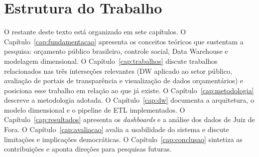 \section{Estrutura do Trabalho}

O restante deste texto está organizado em sete capítulos. O Capítulo~\ref{cap:fundamentacao} apresenta os conceitos teóricos que sustentam a pesquisa: orçamento público brasileiro, controle social, Data Warehouse e modelagem dimensional. O Capítulo~\ref{cap:trabalhos} discute trabalhos relacionados nas três interseções relevantes (DW aplicado ao setor público, avaliação de portais de transparência e visualização de dados orçamentários) e posiciona esse trabalho em relação ao que já existe. O Capítulo~\ref{cap:metodologia} descreve a metodologia adotada. O Capítulo~\ref{cap:dw} documenta a arquitetura, o modelo dimensional e o pipeline de ETL implementados. O Capítulo~\ref{cap:resultados} apresenta os \textit{dashboards} e a análise dos dados de Juiz de Fora. O Capítulo~\ref{cap:avaliacao} avalia a usabilidade do sistema e discute limitações e implicações democráticas. O Capítulo~\ref{cap:conclusao} sintetiza as contribuições e aponta direções para pesquisas futuras.
